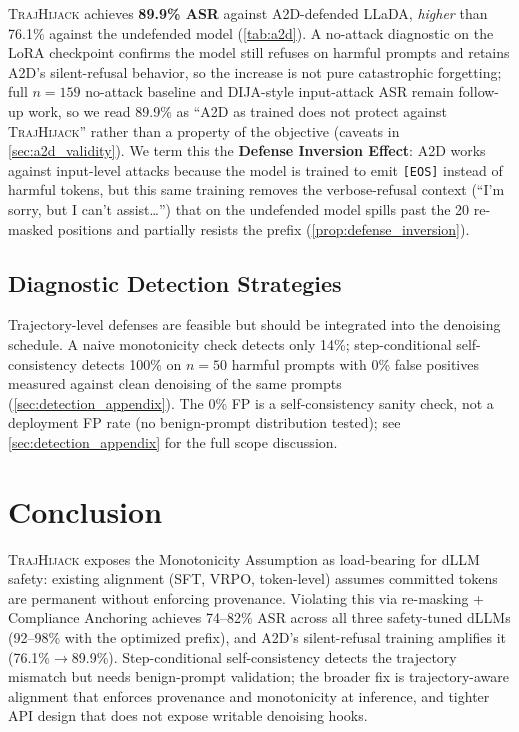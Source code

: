 \documentclass{article}
\theoremstyle{coloredthm}
\newcommand{\method}{\textsc{TrajHijack}}
\newcommand{\dllm}{dLLM}
\newcommand{\dllms}{dLLMs}
\begin{document}
\method{} achieves \textbf{89.9\% ASR} against A2D-defended LLaDA, \textit{higher} than 76.1\% against the undefended model (\cref{tab:a2d}). A no-attack diagnostic on the LoRA checkpoint confirms the model still refuses on harmful prompts and retains A2D's silent-refusal behavior, so the increase is not pure catastrophic forgetting; full $n{=}159$ no-attack baseline and DIJA-style input-attack ASR remain follow-up work, so we read 89.9\% as ``A2D as trained does not protect against \method{}'' rather than a property of the objective (caveats in \cref{sec:a2d_validity}). We term this the \textbf{Defense Inversion Effect}: A2D works against input-level attacks because the model is trained to emit \texttt{[EOS]} instead of harmful tokens, but this same training removes the verbose-refusal context (``I'm sorry, but I can't assist\ldots'') that on the undefended model spills past the 20 re-masked positions and partially resists the prefix (\cref{prop:defense_inversion}).

\subsection{Diagnostic Detection Strategies}

Trajectory-level defenses are feasible but should be integrated into the denoising schedule. A naive monotonicity check detects only 14\%; step-conditional self-consistency detects 100\% on $n{=}50$ harmful prompts with 0\% false positives measured against clean denoising of the same prompts (\cref{sec:detection_appendix}). The 0\% FP is a self-consistency sanity check, not a deployment FP rate (no benign-prompt distribution tested); see \cref{sec:detection_appendix} for the full scope discussion.

\section{Conclusion}

\method{} exposes the Monotonicity Assumption as load-bearing for \dllm{} safety: existing alignment (SFT, VRPO, token-level) assumes committed tokens are permanent without enforcing provenance. Violating this via re-masking + Compliance Anchoring achieves 74--82\% ASR across all three safety-tuned \dllms{} (92--98\% with the optimized prefix), and A2D's silent-refusal training amplifies it (76.1\%$\to$89.9\%). Step-conditional self-consistency detects the trajectory mismatch but needs benign-prompt validation; the broader fix is trajectory-aware alignment that enforces provenance and monotonicity at inference, and tighter API design that does not expose writable denoising hooks.
\end{document}
